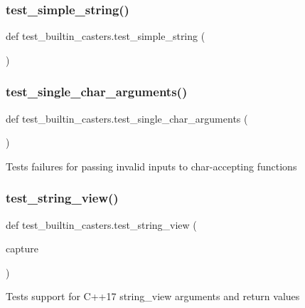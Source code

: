 \subsubsection{\texorpdfstring{test\_simple\_string()}{test\_simple\_string()}}
{\footnotesize\ttfamily def test\+\_\+builtin\+\_\+casters.\+test\+\_\+simple\+\_\+string (\begin{DoxyParamCaption}{ }\end{DoxyParamCaption})}

\mbox{\label{namespacetest__builtin__casters_af767b1b2bfd065cf9cb5edb40b27d431}} 
\subsubsection{\texorpdfstring{test\_single\_char\_arguments()}{test\_single\_char\_arguments()}}
{\footnotesize\ttfamily def test\+\_\+builtin\+\_\+casters.\+test\+\_\+single\+\_\+char\+\_\+arguments (\begin{DoxyParamCaption}{ }\end{DoxyParamCaption})}

\begin{DoxyVerb}Tests failures for passing invalid inputs to char-accepting functions\end{DoxyVerb}
 \mbox{\label{namespacetest__builtin__casters_ae0904fa5521ec9fe9d94e44e59bda883}} 
\subsubsection{\texorpdfstring{test\_string\_view()}{test\_string\_view()}}
{\footnotesize\ttfamily def test\+\_\+builtin\+\_\+casters.\+test\+\_\+string\+\_\+view (\begin{DoxyParamCaption}\item[{}]{capture }\end{DoxyParamCaption})}

\begin{DoxyVerb}Tests support for C++17 string_view arguments and return values\end{DoxyVerb}
 \mbox{\label{namespacetest__builtin__casters_a6077d301b56916ab81a4221c208113dd}} 
